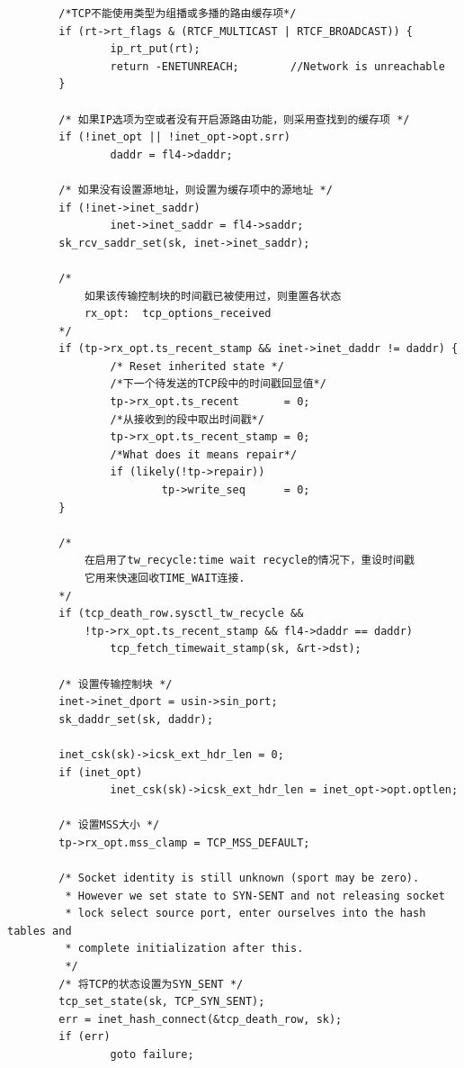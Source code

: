 \begin{verbatim}
        /*TCP不能使用类型为组播或多播的路由缓存项*/
        if (rt->rt_flags & (RTCF_MULTICAST | RTCF_BROADCAST)) {
                ip_rt_put(rt);
                return -ENETUNREACH;        //Network is unreachable
        }

        /* 如果IP选项为空或者没有开启源路由功能，则采用查找到的缓存项 */
        if (!inet_opt || !inet_opt->opt.srr)
                daddr = fl4->daddr;

        /* 如果没有设置源地址，则设置为缓存项中的源地址 */
        if (!inet->inet_saddr)
                inet->inet_saddr = fl4->saddr;
        sk_rcv_saddr_set(sk, inet->inet_saddr);

        /* 
            如果该传输控制块的时间戳已被使用过，则重置各状态 
            rx_opt:  tcp_options_received
        */
        if (tp->rx_opt.ts_recent_stamp && inet->inet_daddr != daddr) {
                /* Reset inherited state */
                /*下一个待发送的TCP段中的时间戳回显值*/
                tp->rx_opt.ts_recent       = 0;     
                /*从接收到的段中取出时间戳*/
                tp->rx_opt.ts_recent_stamp = 0;
                /*What does it means repair*/       
                if (likely(!tp->repair))
                        tp->write_seq      = 0;
        }

        /*  
            在启用了tw_recycle:time wait recycle的情况下，重设时间戳 
            它用来快速回收TIME_WAIT连接.
        */
        if (tcp_death_row.sysctl_tw_recycle &&
            !tp->rx_opt.ts_recent_stamp && fl4->daddr == daddr)
                tcp_fetch_timewait_stamp(sk, &rt->dst);

        /* 设置传输控制块 */
        inet->inet_dport = usin->sin_port;
        sk_daddr_set(sk, daddr);

        inet_csk(sk)->icsk_ext_hdr_len = 0;
        if (inet_opt)
                inet_csk(sk)->icsk_ext_hdr_len = inet_opt->opt.optlen;

        /* 设置MSS大小 */
        tp->rx_opt.mss_clamp = TCP_MSS_DEFAULT;

        /* Socket identity is still unknown (sport may be zero).
         * However we set state to SYN-SENT and not releasing socket
         * lock select source port, enter ourselves into the hash tables and
         * complete initialization after this.
         */
        /* 将TCP的状态设置为SYN_SENT */
        tcp_set_state(sk, TCP_SYN_SENT);
        err = inet_hash_connect(&tcp_death_row, sk);
        if (err)
                goto failure;


\end{verbatim}
